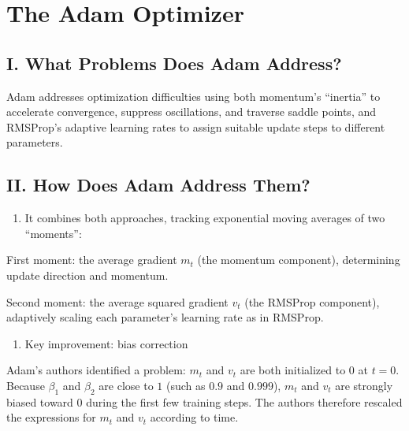 \setcounter{section}{3}

\hypertarget{the-adam-optimizer}{%
\section{The Adam Optimizer}\label{the-adam-optimizer}}

\hypertarget{i.-what-problems-does-adam-address}{%
\subsection{I. What Problems Does Adam Address?}\label{i.-what-problems-does-adam-address}}

Adam addresses optimization difficulties using both momentum's ``inertia'' to accelerate convergence, suppress oscillations, and traverse saddle points, and RMSProp's adaptive learning rates to assign suitable update steps to different parameters.

\hypertarget{ii.-how-does-adam-address-them}{%
\subsection{II. How Does Adam Address Them?}\label{ii.-how-does-adam-address-them}}

\begin{enumerate}
\def\labelenumi{\arabic{enumi}.}
\tightlist
\item
{}
  It combines both approaches, tracking exponential moving averages of two ``moments'':
\end{enumerate}

First moment: the average gradient \(m_t\) (the momentum component), determining update direction and momentum.

Second moment: the average squared gradient \(v_t\) (the RMSProp component), adaptively scaling each parameter's learning rate as in RMSProp.

\begin{enumerate}
\def\labelenumi{\arabic{enumi}.}
\setcounter{enumi}{1}
\tightlist
\item
  Key improvement: bias correction
\end{enumerate}

Adam's authors identified a problem: \(m_t\) and \(v_t\) are both initialized to \(0\) at \(t=0\). Because \(\beta_1\) and \(\beta_2\) are close to \(1\) (such as \(0.9\) and \(0.999\)), \(m_t\) and \(v_t\) are strongly biased toward \(0\) during the first few training steps. The authors therefore rescaled the expressions for \(m_t\) and \(v_t\) according to time.

